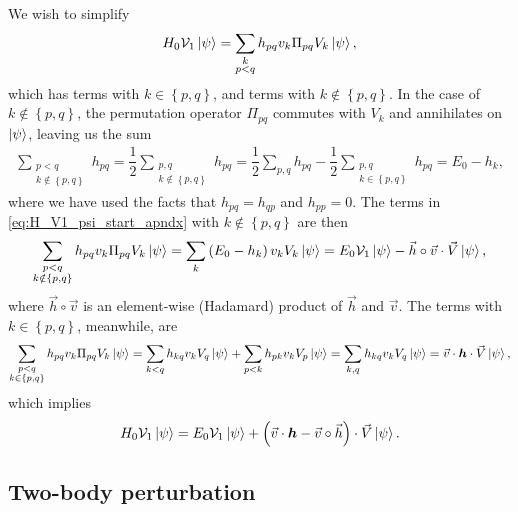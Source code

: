 \documentclass[nofootinbib,notitlepage,11pt]{revtex4-2}
\newcommand{\f}[2]{\dfrac{#1}{#2}} %
\newcommand{\p}[1]{\left(#1\right)} %
\renewcommand{\set}[1]{\left\{#1\right\}} %
\renewcommand{\c}{\cdot} %
\renewcommand{\oc}{\circ} %
\newcommand{\m}{\bm} %
\renewcommand{\v}{\vec} %
\newcommand{\1}{\mathds{1}}
\newcommand{\V}{\mathcal{V}}
\begin{document}
We wish to simplify
\begin{align}
  H_0 \V_1 \ket\psi
  = \sum_{\substack{k\\p<q}} h_{pq} v_k \Pi_{pq} V_k \ket\psi,
  \label{eq:H_V1_psi_start_apndx}
\end{align}
which has terms with $k\in\set{p,q}$, and terms with
$k\notin\set{p,q}$.  In the case of $k\notin\set{p,q}$, the
permutation operator $\Pi_{pq}$ commutes with $V_k$ and annihilates on
$\ket\psi$, leaving us the sum
\begin{align}
  \sum_{\substack{p<q\\k\notin\set{p,q}}} h_{pq}
  = \f12 \sum_{\substack{p,q\\k\notin\set{p,q}}} h_{pq}
  = \f12 \sum_{p,q} h_{pq}
  - \f12 \sum_{\substack{p,q\\k\in\set{p,q}}} h_{pq}
  = E_0 - h_k,
\end{align}
where we have used the facts that $h_{pq}=h_{qp}$ and $h_{pp}=0$.  The
terms in \eqref{eq:H_V1_psi_start_apndx} with $k\notin\set{p,q}$ are
then
\begin{align}
  \sum_{\substack{p<q\\k\notin\set{p,q}}}
  h_{pq} v_k \Pi_{pq} V_k \ket\psi
  = \sum_k \p{E_0 - h_k} v_k V_k \ket\psi
  = E_0 \V_1 \ket\psi - \v h\oc\v v \c\v V \ket\psi,
\end{align}
where $\v h\oc\v v$ is an element-wise (Hadamard) product of $\v h$
and $\v v$.  The terms with $k\in\set{p,q}$, meanwhile, are
\begin{align}
  \sum_{\substack{p<q\\k\in\set{p,q}}}
  h_{pq} v_k \Pi_{pq} V_k \ket\psi
  = \sum_{k<q} h_{kq} v_k V_q \ket\psi
  + \sum_{p<k} h_{pk} v_k V_p \ket\psi
  = \sum_{k,q} h_{kq} v_k V_q \ket\psi
  = \v v\c\m h\c\v V \ket\psi,
\end{align}
which implies
\begin{align}
  H_0 \V_1 \ket\psi
  = E_0 \V_1 \ket\psi
  + \p{\v v\c\m h - \v v\oc\v h}\c \v V \ket\psi.
\end{align}

\subsection{Two-body perturbation}
\label{sec:H_V2_psi}
\end{document}
